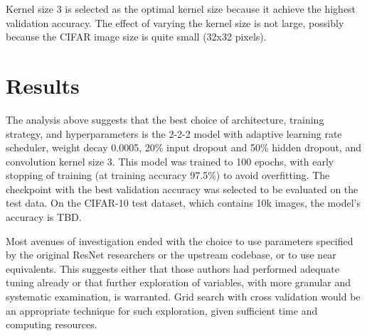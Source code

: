 \documentclass[letterpaper]{article} %
\begin{document}
Kernel size 3 is selected as the optimal kernel size because it achieve the highest validation accuracy.
The effect of varying the kernel size is not large, possibly because the CIFAR image size is quite small (32x32 pixels).

\section{Results}

The analysis above suggests that the best choice of architecture, training strategy, and hyperparameters is the 2-2-2
model with adaptive learning rate scheduler, weight decay 0.0005, 20\% input dropout and 50\% hidden dropout, and
convolution kernel size 3.
This model was trained to 100 epochs, with early stopping of training (at training accuracy 97.5\%) to avoid overfitting.
The checkpoint with the best validation accuracy was selected to be evaluated on the test data.
On the CIFAR-10 test dataset, which contains 10k images, the model's accuracy is TBD.

Most avenues of investigation ended with the choice to use parameters specified by the original ResNet researchers or
the upstream codebase, or to use near equivalents.
This suggests either that those authors had performed adequate tuning already or that further exploration of variables,
with more granular and systematic examination, is warranted.
Grid search with cross validation would be an appropriate technique for such exploration, given sufficient time and
computing resources.


\end{document}
